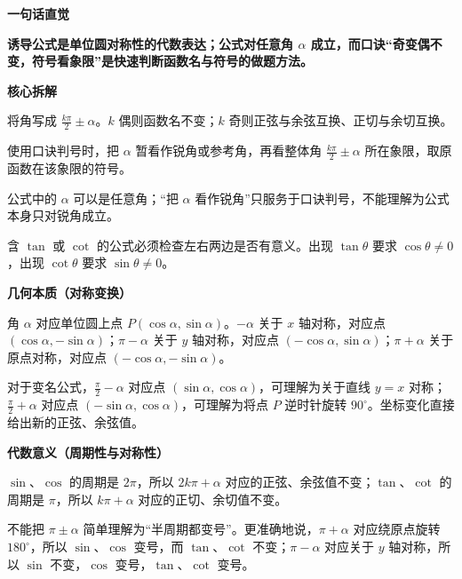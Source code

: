 \begin{explanationbox}
\textbf{\textcolor{CExplanation}{一句话直觉}}

\textbf{诱导公式是单位圆对称性的代数表达；公式对任意角 $\alpha$ 成立，而口诀“奇变偶不变，符号看象限”是快速判断函数名与符号的做题方法。}

\medskip
\textbf{\textcolor{CExplanation}{核心拆解}}
\begin{description}[style=nextline, leftmargin=2.8em, labelsep=0.5em, itemsep=0.45em]
    \item[\textbf{要点一（奇偶判定）：}] 将角写成 $\frac{k\pi}{2}\pm\alpha$。$k$ 偶则函数名不变；$k$ 奇则正弦与余弦互换、正切与余切互换。
    \item[\textbf{要点二（符号判定）：}] 使用口诀判号时，把 $\alpha$ 暂看作锐角或参考角，再看整体角 $\frac{k\pi}{2}\pm\alpha$ 所在象限，取原函数在该象限的符号。
    \item[\textbf{要点三（任意角与参考角）：}] 公式中的 $\alpha$ 可以是任意角；“把 $\alpha$ 看作锐角”只服务于口诀判号，不能理解为公式本身只对锐角成立。
    \item[\textbf{要点四（定义域）：}] 含 $\tan$ 或 $\cot$ 的公式必须检查左右两边是否有意义。出现 $\tan\theta$ 要求 $\cos\theta\neq0$，出现 $\cot\theta$ 要求 $\sin\theta\neq0$。
\end{description}

\medskip
\textbf{\textcolor{CExplanation}{几何本质（对称变换）}}

角 $\alpha$ 对应单位圆上点 $P(\cos\alpha,\sin\alpha)$。$-\alpha$ 关于 $x$ 轴对称，对应点 $(\cos\alpha,-\sin\alpha)$；$\pi-\alpha$ 关于 $y$ 轴对称，对应点 $(-\cos\alpha,\sin\alpha)$；$\pi+\alpha$ 关于原点对称，对应点 $(-\cos\alpha,-\sin\alpha)$。

对于变名公式，$\frac{\pi}{2}-\alpha$ 对应点 $(\sin\alpha,\cos\alpha)$，可理解为关于直线 $y=x$ 对称；$\frac{\pi}{2}+\alpha$ 对应点 $(-\sin\alpha,\cos\alpha)$，可理解为将点 $P$ 逆时针旋转 $90^\circ$。坐标变化直接给出新的正弦、余弦值。

\medskip
\textbf{\textcolor{CExplanation}{代数意义（周期性与对称性）}}

$\sin$、$\cos$ 的周期是 $2\pi$，所以 $2k\pi+\alpha$ 对应的正弦、余弦值不变；$\tan$、$\cot$ 的周期是 $\pi$，所以 $k\pi+\alpha$ 对应的正切、余切值不变。

不能把 $\pi\pm\alpha$ 简单理解为“半周期都变号”。更准确地说，$\pi+\alpha$ 对应绕原点旋转 $180^\circ$，所以 $\sin$、$\cos$ 变号，而 $\tan$、$\cot$ 不变；$\pi-\alpha$ 对应关于 $y$ 轴对称，所以 $\sin$ 不变，$\cos$ 变号，$\tan$、$\cot$ 变号。


\end{explanationbox}
